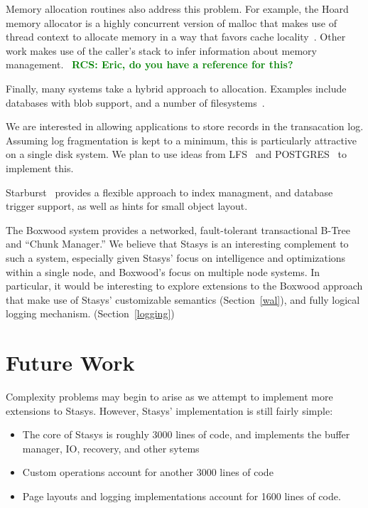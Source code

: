 \documentclass[letterpaper,twocolumn,10pt]{article}
\newcommand{\yad}{Stasys\xspace}
\newcommand{\yads}{Stasys'\xspace}
\newcommand{\rcs}[1]{\textcolor{green}{\bf RCS: #1}}
\begin{document}
Memory allocation routines also address this problem.  For example, the Hoard memory
allocator is a highly concurrent version of malloc that
makes use of thread context to allocate memory in a way that favors
cache locality~\cite{hoard}.  Other work makes use of the caller's stack to infer
information about memory management.~\cite{xxx} \rcs{Eric, do you have
  a reference for this?}

Finally, many systems take a hybrid approach to allocation.  Examples include
databases with blob support\cite{something}, and a number of
filesystems~\cite{reiserfs3,didFFSdoThis}.

We are interested in allowing applications to store records in
the transacation log.  Assuming log fragmentation is kept to a
minimum, this is particularly attractive on a single disk system.  We
plan to use ideas from LFS~\cite{lfs} and POSTGRES~\cite{postgres}
to implement this.

Starburst~\cite{starburst} provides a flexible approach to index
managment, and database trigger support, as well as hints for small
object layout.

The Boxwood system provides a networked, fault-tolerant transactional
B-Tree and ``Chunk Manager.''  We believe that \yad is an interesting
complement to such a system, especially given \yads focus on
intelligence and optimizations within a single node, and Boxwood's
focus on multiple node systems.  In particular, it would be
interesting to explore extensions to the Boxwood approach that make
use of \yads customizable semantics (Section~\ref{wal}), and fully logical logging
mechanism. (Section~\ref{logging})

\section{Future Work}

Complexity problems may begin to arise as we attempt to implement more
extensions to \yad.  However, \yads implementation is still fairly simple:

\begin{itemize}
\item The core of \yad is roughly 3000 lines
of code, and implements the buffer manager, IO, recovery, and other
sytems
\item Custom operations account for another 3000 lines of code
\item Page layouts and logging implementations account for 1600 lines of code.
\end{itemize}
\end{document}
